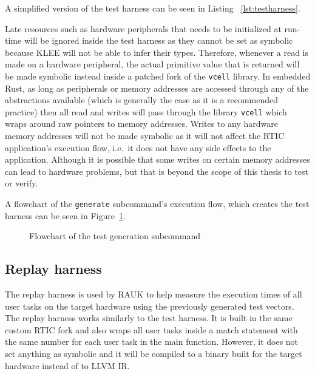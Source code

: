 A simplified version of the test harness can be seen in Listing
~\ref{lst:testharness}.



Late resources such as hardware peripherals that needs to be initialized at
run-time will be ignored inside the test harness as they cannot be set as
symbolic because KLEE will not be able to infer their types. Therefore, whenever
a read is made on a hardware peripheral, the actual primitive value that is
returned will be made symbolic instead inside a patched fork of the
\texttt{vcell} library. In embedded Rust, as long as peripherals or memory
addresses are accessed through any of the abstractions available (which is
generally the case as it is a recommended practice) then all read and writes will pass
through the library \texttt{vcell} which wraps around raw pointers to memory
addresses. Writes to any hardware memory addresses will not be made symbolic as
it will not affect the RTIC application's execution flow, i.e.\ it does not
have any side effects to the application. Although it is possible that some
writes on certain memory addresses can lead to hardware problems, but that is
beyond the scope of this thesis to test or verify.

A flowchart of the \texttt{generate} subcommand's execution flow, which creates
the test harness can be seen in Figure~\ref{fig:generatecmd}.
\begin{figure}[H]
    \centering
    \caption{Flowchart of the test generation subcommand}
    \label{fig:generatecmd}
\end{figure}

\subsection{Replay harness}
The replay harness is used by RAUK to help measure the execution times of all
user tasks on the target hardware using the previously generated test vectors.
The replay harness works similarly to the test harness. It is built in the same
custom RTIC fork and also wraps all user tasks inside a match statement with
the same number for each user task in the main function. However, it does not
set anything as symbolic and it will be compiled to a binary built for the
target hardware instead of to LLVM IR\@.

